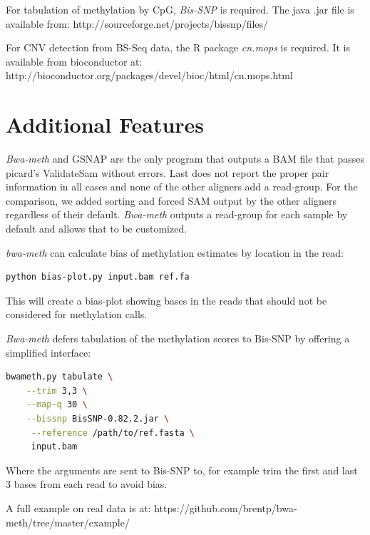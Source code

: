 \documentclass[12pt]{article}
\begin{document}
For tabulation of methylation by CpG, \emph{Bis-SNP} \cite{bissnp} is required.
The java .jar file is available from: http://sourceforge.net/projects/bissnp/files/

For CNV detection from BS-Seq data, the R package \emph{cn.mops} \cite{cnmops} is required.
It is available
from bioconductor \cite{bioconductor} at: http://bioconductor.org/packages/devel/bioc/html/cn.mops.html
\section{Additional Features}
\textit{Bwa-meth} and GSNAP are the only program that outputs a BAM file that passes picard's ValidateSam without errors.
Last does not report the proper pair information in all cases and none of the other aligners add a read-group.
For the comparison, we added sorting and forced SAM output by the other aligners regardless of their default.
\textit{Bwa-meth} outputs a read-group for each sample by default and allows that to be customized.

\textit{bwa-meth} can calculate bias of methylation estimates by location in the read:

\begin{lstlisting}[language=bash]
python bias-plot.py input.bam ref.fa
\end{lstlisting}
This will create a bias-plot showing bases in the reads that should not be considered
for methylation calls.

\textit{Bwa-meth} defers tabulation of the methylation scores to Bis-SNP \cite{bissnp} by offering a simplified interface:
\begin{lstlisting}[language=bash]
bwameth.py tabulate \
    --trim 3,3 \
    --map-q 30 \
    --bissnp BisSNP-0.82.2.jar \
     --reference /path/to/ref.fasta \
     input.bam
\end{lstlisting}
Where the arguments are sent to Bis-SNP to, for example trim the first and last 3 bases
from each read to avoid bias.

A full example on real data is at:
https://github.com/brentp/bwa-meth/tree/master/example/


    
\end{document}
